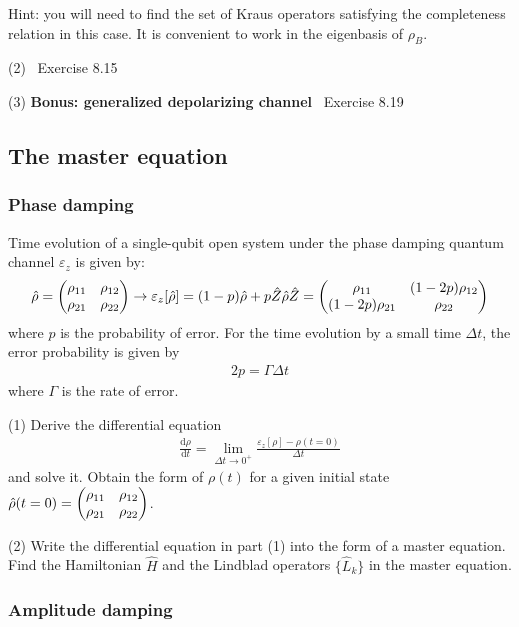 Hint: you will need to find the set of Kraus operators satisfying the completeness relation in this case. It is convenient to work in the eigenbasis of $\rho_B$.  
 
(2) \nielsen~Exercise 8.15


(3) \textbf{Bonus: generalized depolarizing channel} \nielsen~Exercise 8.19





\subsection{The master equation}

\subsubsection{Phase damping}

Time evolution of a single-qubit open system under the phase damping quantum channel $\varepsilon_z$ is given by:
\begin{align}
\hat\rho=\begin{pmatrix}\rho_{11}&\rho_{12}\\ \rho_{21}&\rho_{22}\end{pmatrix}\rightarrow\varepsilon_z[\hat\rho]=(1-p)\hat\rho+p\hat Z\hat\rho \hat Z=\begin{pmatrix}\rho_{11}&(1-2p)\rho_{12}\\ (1-2p)\rho_{21}&\rho_{22}\end{pmatrix}
\end{align}
where $p$ is the probability of error. For the time evolution by a small time $\Delta t$, the error probability is given by
\begin{align}
2p=\Gamma\Delta t
\end{align}
where $\Gamma$ is the rate of error. 

(1) Derive the differential equation 
\begin{align}
\frac{\text{d}\rho}{\text{d}t}=\lim_{\Delta t\rightarrow0^+}\frac{\varepsilon_z[\rho]-\rho(t=0)}{\Delta t}
\end{align}
and solve it. Obtain the form of $\rho(t)$ for a given initial state $\hat\rho(t=0)=\begin{pmatrix}\rho_{11}&\rho_{12}\\ \rho_{21}&\rho_{22}\end{pmatrix}$. 

(2) Write the differential equation in part (1) into the form of a master equation. Find the Hamiltonian $\hat H$ and the Lindblad operators $\{\hat L_k\}$ in the master equation. 


\subsubsection{Amplitude damping}

